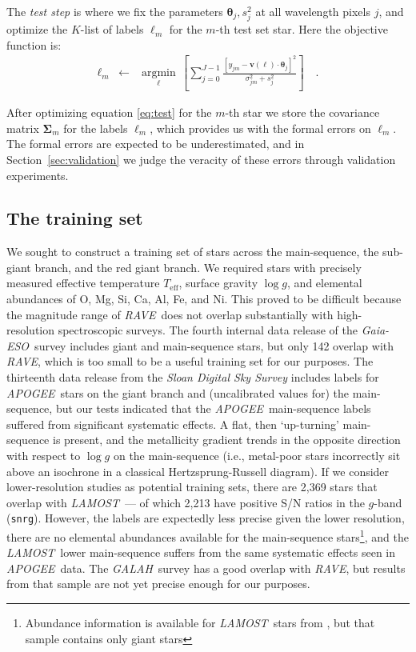 \documentclass[preprint,trackchanges]{aastex}
\newcommand{\acronym}[1]{{\small{#1}}}
\newcommand{\project}[1]{\textsl{#1}}
\newcommand{\rave}{\project{\acronym{RAVE}}}
\newcommand{\galah}{\project{\acronym{GALAH}}}
\newcommand{\ges}{\project{Gaia-ESO}}
\newcommand{\apogee}{\project{\acronym{APOGEE}}}
\newcommand{\lamost}{\project{\acronym{LAMOST}}}
\newcommand{\teff}{T_{\mathrm{eff}}}
\newcommand{\logg}{\log g}
\newcommand{\Dvector}[1]{\boldsymbol{#1}}
\newcommand{\vectheta}{\Dvector{\theta}}
\newcommand{\vecv}{\Dvector{v}}
\newcommand{\argmin}[1]{\underset{#1}{\operatorname{argmin}}\,}
\begin{document}
The \emph{test step} is where we fix the parameters $\vectheta_j,s_j^2$ at all wavelength
pixels $j$, and optimize the $K$-list of labels $\ell_m$ for the $m$-th test set star.  Here
the objective function is:
\begin{eqnarray}\label{eq:test}
  \ell_m &\leftarrow& \argmin{\ell}\left[
    \sum_{j=0}^{J-1} \frac{[y_{jm}-\vecv(\ell)\cdot\vectheta_j]^2}{\sigma_{jm}^2 + s_j^2}
    \right]
  \quad .
\end{eqnarray}

After optimizing equation \ref{eq:test} for the $m$-th star we store the covariance matrix 
$\bm{\Sigma}_m$ for the labels $\ell_m$, which provides us with the formal errors on $\ell_m$. 
The formal errors are expected to be underestimated, and in Section~\ref{sec:validation} 
we judge the veracity of these errors through validation experiments.



\subsection{The training set}
\label{sec:the-training-set}


We sought to construct a training set of stars across the main-sequence, the
sub-giant branch, and the red giant branch.  We required stars with precisely measured
effective temperature $\teff$, surface gravity $\logg$, and elemental abundances
of O, Mg, Si, Ca, Al, Fe, and Ni.  This proved to be difficult because the magnitude
range of \rave\ does not overlap substantially with high-resolution spectroscopic
surveys.  The fourth internal data release of the \ges\ survey includes 
giant and main-sequence stars, but only 142 overlap with \rave, which is too small to
be a useful training set for our purposes.  The thirteenth data release from the 
\project{Sloan Digital Sky Survey} \citep{sloan_dr13} includes labels for \apogee\ stars on the
giant branch and (uncalibrated values for) the main-sequence, but our tests indicated
that the \apogee\ main-sequence labels suffered from significant systematic effects.  
A flat, then `up-turning' main-sequence is present, and the metallicity gradient trends in 
the opposite direction with respect to $\logg$ on the main-sequence (i.e., metal-poor
stars incorrectly sit above an isochrone in a classical Hertzsprung-Russell diagram).
If we consider lower-resolution studies as potential training sets, there are 2,369
stars that overlap with \lamost\ --- of which 2,213 have positive S/N ratios in the 
$g$-band (\texttt{snrg}).  However, the labels are expectedly less precise given the
lower resolution, there are no elemental abundances available for the main-sequence 
stars\footnote{Abundance information is available for \lamost\ stars from \citet{Ho_2016},
but that sample contains only giant stars}, and the \lamost\ lower main-sequence suffers
from the same systematic effects seen in \apogee\ data.  The \galah\ survey has a good 
overlap with \rave, but results from that sample are not yet precise enough for our 
purposes.
\end{document}
